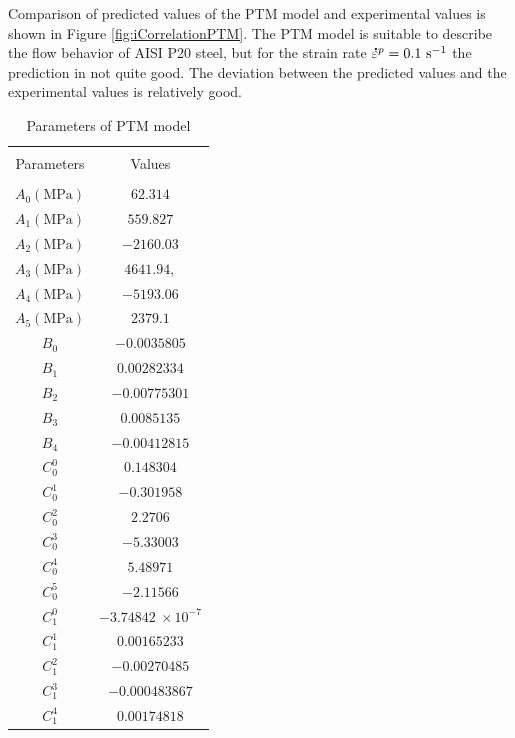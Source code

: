 \documentclass[twoside,english,1p,final,sort&compress]{elsarticle}
\theoremstyle{plain}
\newcommand{\mdot}[1]{\accentset{\mbox{\bfseries .}}{#1}}
\begin{document}
Comparison of predicted values of the PTM model and experimental values is shown in Figure \ref{fig:iCorrelationPTM}. The PTM model is suitable to describe the ﬂow behavior of AISI P20 steel, but for the strain rate $\mdot\varepsilon^p = 0.1\ \text{s}^{-1}$ the prediction in not quite good. The deviation between the predicted values and the experimental values is relatively good.
\begin{table}[!h]
\centering{}
\caption{Parameters of PTM model\label{tab:PTM-parameters}}
\begin{tabular}{cc}
\hline
&   \\
Parameters &Values\\
&   \\
\hline
$A_0 (\text{MPa})$ & $62.314$ \\
$A_1 (\text{MPa})$ & $559.827$ \\
$A_2 (\text{MPa})$ & $-2160.03$ \\
$A_3 (\text{MPa})$ & $4641.94,$ \\
$A_4 (\text{MPa})$ & $-5193.06$ \\
$A_5 (\text{MPa})$ & $2379.1$ \\
$B_0 $   & $-0.0035805$\\
$B_1 $   & $0.00282334$ \\
$B_2 $   & $-0.00775301$\\
$B_3 $   & $0.0085135$ \\
$B_4 $   & $-0.00412815$\\
$C_0^0 $ & $0.148304$ \\
$C_0^1 $ & $-0.301958$ \\
$C_0^2 $ & $2.2706$ \\
$C_0^3 $ & $-5.33003$ \\
$C_0^4 $ & $5.48971$ \\
$C_0^5 $ & $-2.11566$\\
$C_1^0 $ & $-3.74842\ \times10^{-7}$\\
$C_1^1 $ & $0.00165233$\\
$C_1^2 $ & $-0.00270485$ \\
$C_1^3 $ & $-0.000483867$\\
$C_1^4 $ & $0.00174818$ \\
\hline
\end{tabular}
\end{table}
\end{document}
